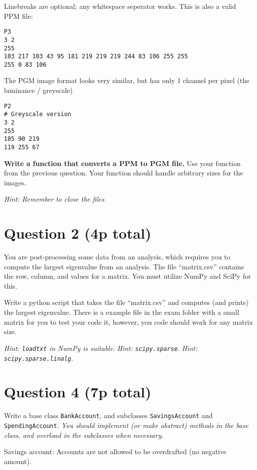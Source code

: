 \documentclass[]{article}
\begin{document}
Linebreaks are optional; any whitespace seperator works. This is also a
valid PPM file:

\begin{verbatim}
P3
3 2
255
103 217 103 43 95 181 219 219 219 244 83 106 255 255
255 0 83 106
\end{verbatim}

The PGM image format looks very similar, but has only 1 channel per
pixel (the luminance / greyscale)

\begin{verbatim}
P2
# Greyscale version
3 2
255
185 90 219
119 255 67
\end{verbatim}

\textbf{Write a function that converts a PPM to PGM file.} Use your
function from the previous question. Your function should handle
arbitrary sizes for the images.

\emph{Hint: Remember to close the files}

\section{Question 2 (4p total)}\label{question-2-4p-total}

You are post-processing some data from an analysis, which requires you
to compute the largest eigenvalue from an analysis. The file
``matrix.csv'' contains the row, column, and values for a matrix. You
must utilize NumPy and SciPy for this.

Write a python script that takes the file ``matrix.csv'' and computes
(and prints) the largest eigenvalue. There is a example file in the exam
folder with a small matrix for you to test your code it, however, you
code should work for any matrix size.

\emph{Hint: \texttt{loadtxt} in NumPy is suitable}. \emph{Hint:
\texttt{scipy.sparse}}. \emph{Hint: \texttt{scipy.sparse.linalg}}.

\section{Question 4 (7p total)}\label{question-4-7p-total}

Write a base class \texttt{BankAccount}, and subclasses
\texttt{SavingsAccount} and \texttt{SpendingAccount}. \emph{You should
implement (or make abstract) methods in the base class, and overload in
the subclasses when necessary.}

Savings account: Accounts are not allowed to be overdrafted (no negative
amount).
\end{document}
